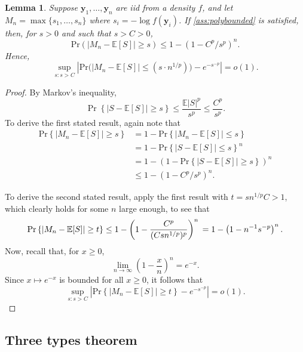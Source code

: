 \documentclass[a4paper,11pt]{article}
\newcommand{\E}{\mathbb{E}}
\newtheorem{lemma}{Lemma}
\begin{document}
\begin{lemma}\label{lem:bounds_poly}
	Suppose $\bm{y}_1,\dots,\bm{y}_n$ are iid from a density $f$, and let $M_n = \max\{s_1,\dots,s_n\}$ where $s_i = -\log f(\bm{y}_i)$. If \cref{ass:polybounded} is satisfied, then, for $s>0$ and such that $s>C>0$,
	$$
		\mathrm{Pr}\left(|M_n-\E[S]|\ge s\right) \le 1- (1-C^p/s^p)^n.
	$$
	Hence,
	$$
		\sup_{s:s>C} \left|\mathrm{Pr}\big(|M_n-\E[S]|\le (s\cdot n^{1/p})\big)-e^{-s^{-p}}\right|=o(1).
	$$
\end{lemma}
\begin{proof}
	By Markov's inequality,
	$$
		\Pr\left\{ |S-\E[S]|\ge s\right\}\le \frac{\E|S|^p}{s^p}\le \frac{C^p}{s^p}.
	$$
	To derive the first stated result, again note that
	\begin{align*}
		\mathrm{Pr}\left\{|M_n-\E[S]|\ge s\right\}
		 & = 1 -\mathrm{Pr}\left\{|M_n-\E[S]|\le s\right\}               \\
		 & = 1-\mathrm{Pr}\left\{|S-\E[S]|\le s\right\}^n                \\
		 & = 1-\left(1-\mathrm{Pr}\left\{|S-\E[S]|\ge s\right\}\right)^n \\
		 & \le 1-(1-C^p/s^p)^n.
	\end{align*}

	To derive the second stated result, apply the first result with $t=sn^{1/p}C>1$, which clearly holds for some $n$ large enough, to see that
	$$
		\mathrm{Pr}\left\{|M_n-\E[S]|\ge t\right\}
		\le 1- \left(1-\frac{C^p}{(Csn^{1/p})^p}\right)^n \\
		= 1-\left(1-n^{-1}s^{-p}\right)^n.
	$$
	Now, recall that, for $x\ge0$,
	$$
		\lim_{n\rightarrow\infty}\left(1-\frac{x}{n}\right)^n=e^{-x}.
	$$
	Since $x\mapsto e^{-x}$ is bounded for all $x\ge0$, it follows that
	$$
		\sup_{s:s>C}\left|\mathrm{Pr}\left\{|M_n-\E[S]|\ge t\right\}-e^{-s^{-p}}\right|=o(1).
	$$
\end{proof}

\subsection{Three types theorem}
\end{document}
